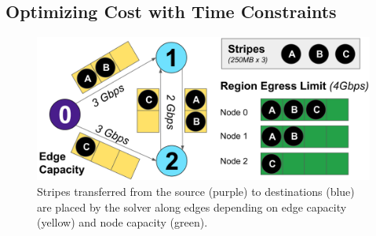 



\subsection{Optimizing Cost with Time Constraints}
\label{sec-optimizer}

\begin{figure}[t]
     \centering
     \includegraphics[width=0.8\linewidth]{figures/solver_overview.pdf}
     \caption{Stripes transferred from the source (purple) to destinations (blue) are placed by the solver along edges depending on edge capacity (yellow) and node capacity (green).}
     \label{fig:solver}
\end{figure}


